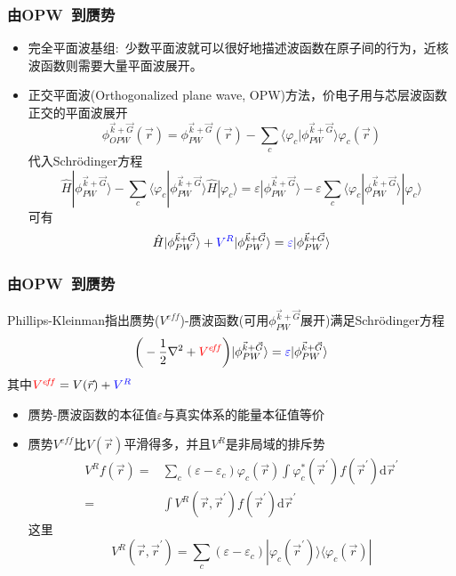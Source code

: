 \documentclass[cjk,slidestop,compress,mathserif,blue]{beamer}
\newcommand{\upcite}[1]{\hspace{0ex}\textsuperscript{\cite{#1}}} %
\begin{document}
\frame
{
	\frametitle{由\textrm{OPW~}到赝势}
\begin{itemize}
\setlength{\itemsep}{5pt}
	\item 完全平面波基组:~少数平面波就可以很好地描述波函数在原子间的行为，近核波函数则需要大量平面波展开。%
	\item 正交平面波(\textrm{Orthogonalized plane wave, OPW})方法，价电子用与芯层波函数正交的平面波展开
		\begin{displaymath}
			\phi_{OPW}^{\vec k+\vec G}(\vec r)=\phi_{PW}^{\vec k+\vec G}(\vec r)-\sum_c\langle\varphi_c|\phi_{PW}^{\vec k+\vec G}\rangle\varphi_c(\vec r)
		\end{displaymath}
		代入\textrm{Schr\"odinger}方程
		$$\hat H|\phi_{PW}^{\vec k+\vec G}\rangle-\sum_c\langle\varphi_c|\phi_{PW}^{\vec k+\vec G}\rangle\hat H|\varphi_c\rangle=\varepsilon|\phi_{PW}^{\vec k+\vec G}\rangle-\varepsilon\sum_c\langle\varphi_c|\phi_{PW}^{\vec k+\vec G}\rangle|\varphi_c\rangle$$
		可有$$\hat H|\phi_{PW}^{\vec k+\vec G}\rangle+\textcolor{blue}{V^R}|\phi_{PW}^{\vec k+\vec G}\rangle=\textcolor{blue}{\varepsilon}|\phi_{PW}^{\vec k+\vec G}\rangle$$
\end{itemize}
}

\frame
{
	\frametitle{由\textrm{OPW~}到赝势}
	\textrm{Phillips-Kleinman}指出赝势($V^{e\!f\!f}$)-赝波函数(可用$\phi_{PW}^{\vec k+\vec G}$展开)满足\textrm{Schr\"odinger}方程\upcite{PR116_1959}
	$$\bigg(-\dfrac12\nabla^2+\textcolor{red}{V^{e\!f\!f}}\bigg)|\phi_{PW}^{\vec k+\vec G}\rangle=\textcolor{blue}{\varepsilon}|\phi_{PW}^{\vec k+\vec G}\rangle$$
	其中$\textcolor{red}{V^{e\!f\!f}}=V(\vec r)+\textcolor{blue}{V^R}$
	\begin{itemize}
		\item 赝势-赝波函数的本征值$\varepsilon$与真实体系的能量本征值等价
		\item 赝势$V^{e\!f\!f}$比$V(\vec r)$平滑得多，并且$V^R$是非局域的排斥势
			\begin{displaymath}
				\begin{aligned}
					V^Rf(\vec r)=&\sum_c(\varepsilon-\varepsilon_c)\varphi_c(\vec r)\int\varphi_c^{\ast}(\vec r^{\prime})f(\vec r^{\prime})\mathrm{d}\vec r^{\prime} \\
					=&\int V^R(\vec r,\vec r^{\prime})f(\vec r^{\prime})\mathrm{d}\vec r^{\prime}
				\end{aligned}
			\end{displaymath}
			这里$$V^R(\vec r,\vec r^{\prime})=\sum_c(\varepsilon-\varepsilon_c)|\varphi_c(\vec r^{\prime})\rangle\langle\varphi_c(\vec r)|$$
	\end{itemize}
}
\end{document}
